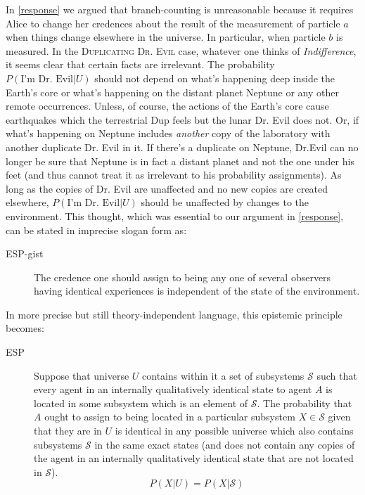 \documentclass[12pt,onecolumn,secnumarabic,amsmath,amssymb,balancelastpage,nofootinbib]{article}
\begin{document}
In \textsection \ref{response} we argued that branch-counting is unreasonable because it requires Alice to change her credences about the result of the measurement of particle $a$ when things change elsewhere in the universe. In particular, when particle $b$ is measured.  In the \textsc{Duplicating Dr. Evil} case, whatever one thinks of \emph{Indifference}, it seems clear that certain facts are irrelevant. The probability $P(\text{I'm Dr. Evil}|U)$ should not depend on what's happening deep inside the Earth's core or what's happening on the distant planet Neptune or any other remote occurrences.  Unless, of course, the actions of the Earth's core cause earthquakes which the terrestrial Dup feels but the lunar Dr. Evil does not.  Or, if what's happening on Neptune includes \emph{another} copy of the laboratory with another duplicate Dr. Evil in it.  If there's a duplicate on Neptune, Dr.Evil can no longer be sure that Neptune is in fact a distant planet and not the one under his feet (and thus cannot treat it as irrelevant to his probability assignments).  As long as the copies of Dr. Evil are unaffected and no new copies are created elsewhere, $P(\text{I'm Dr. Evil}|U)$ should be unaffected by changes to the environment.  This thought, which was essential to our argument in \textsection \ref{response}, can be stated in imprecise slogan form as:
\begin{description}
\item[ESP-gist]  The credence one should assign to being any one of several observers having identical experiences is independent of the state of the environment.
\end{description}
In more precise but still theory-independent language, this epistemic principle becomes:
\begin{description}
\item[ESP]  Suppose that universe $U$ contains within it a set of subsystems $\mathcal{S}$ such that every agent in an internally qualitatively identical state to agent $A$ is located in some subsystem which is an element of $\mathcal{S}$.  The probability that $A$ ought to assign to being located in a particular subsystem $X\in\mathcal{S}$ given that they are in $U$ is identical in any possible universe which also contains subsystems $\mathcal{S}$ in the same exact states (and does not contain any copies of the agent in an internally qualitatively identical state that are not located in $\mathcal{S}$).
\begin{equation}
P(X|U)=P(X|\mathcal{S})
\label{esp}
\end{equation}
\end{description}
\end{document}
